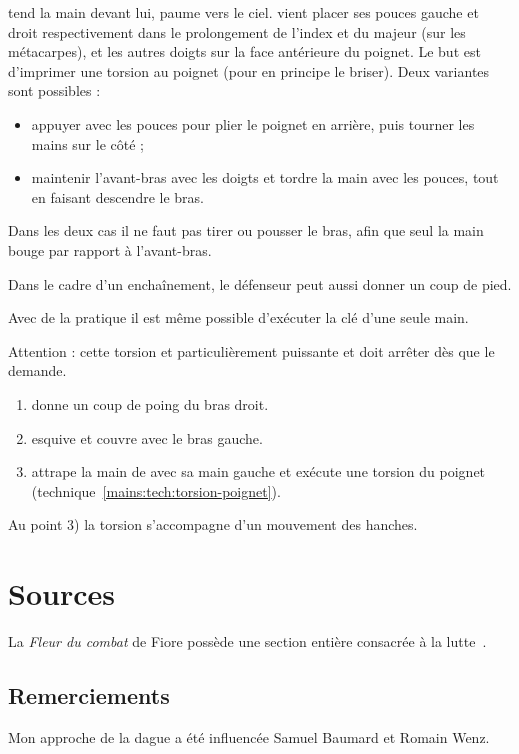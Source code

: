\begin{technique}
	\label{mains:tech:torsion-poignet}

	\A tend la main devant lui, paume vers le ciel.
	\D vient placer ses pouces gauche et droit respectivement dans le prolongement de l'index et du majeur (sur les métacarpes), et les autres doigts sur la face antérieure du poignet.
	Le but est d'imprimer une torsion au poignet (pour en principe le briser).
	Deux variantes sont possibles :
	\begin{itemize}
		\item appuyer avec les pouces pour plier le poignet en arrière, puis tourner les mains sur le côté ;
		\item maintenir l'avant-bras avec les doigts et tordre la main avec les pouces, tout en faisant descendre le bras.
	\end{itemize}
	Dans les deux cas il ne faut pas tirer ou pousser le bras, afin que seul la main bouge par rapport à l'avant-bras.

	Dans le cadre d'un enchaînement, le défenseur peut aussi donner un coup de pied.

	Avec de la pratique il est même possible d'exécuter la clé d'une seule main.

	Attention : cette torsion et particulièrement puissante et \D doit arrêter dès que \A le demande.
\end{technique}


\begin{technique}

	\begin{enumerate}
		\item \A donne un coup de poing du bras droit.
		
		\item \D esquive et couvre avec le bras gauche.
		
		\item \D attrape la main de \A avec sa main gauche et exécute une torsion du poignet (technique~\ref{mains:tech:torsion-poignet}).
	\end{enumerate}

	Au point 3) la torsion s'accompagne d'un mouvement des hanches.
\end{technique}


\section{Sources}


La \emph{Fleur du combat} de Fiore possède une section entière consacrée à la lutte~\cite{deiLiberi:Conan:2013:FleurCombat:Lutte}.


\subsection*{Remerciements}


Mon approche de la dague a été influencée Samuel Baumard et Romain Wenz.
